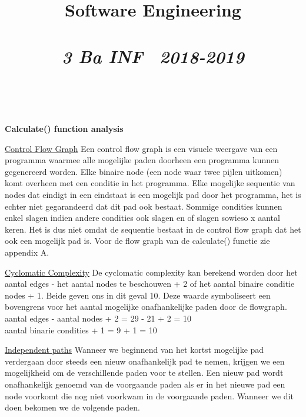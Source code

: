 \documentclass{article}
\title{\textmd{\textbf{Software Engineering}}\\\normalsize\vspace{0.1in}\Large{\assignmentname}\\\vspace{0.1in}\small{\textit{3 Ba INF \  2018-2019}}}
\author{\studentA \\ \studentB}
\begin{document}
\maketitle
\noindent
\textbf{Calculate() function analysis} \newline
\newline
\maketitle
\noindent
\underline{Control Flow Graph}\newline
\newline
Een control flow graph is een visuele weergave van een programma waarmee alle mogelijke paden doorheen een programma kunnen gegenereerd worden. Elke binaire node (een node waar twee pijlen uitkomen) komt overheen met een conditie in het programma. Elke mogelijke sequentie van nodes dat eindigt in een eindstaat is een mogelijk pad door het programma, het is echter niet gegarandeerd dat dit pad ook bestaat. Sommige condities kunnen enkel slagen indien andere condities ook slagen en of slagen sowieso x aantal keren. Het is dus niet omdat de sequentie bestaat in de control flow graph dat het ook een mogelijk pad is. Voor de flow graph van de calculate() functie zie appendix A. \\
\newline
\maketitle
\noindent
\underline{Cyclomatic Complexity}\newline
\newline
De cyclomatic complexity kan berekend worden door het aantal edges - het aantal nodes te beschouwen + 2 of het aantal binaire conditie nodes + 1. Beide geven ons in dit geval 10. Deze waarde symboliseert een bovengrens voor het aantal mogelijke onafhankelijke paden door de flowgraph. \\
aantal edges - aantal nodes + 2 = 29 - 21 + 2 = 10 \\
aantal binarie condities + 1 = 9 + 1 = 10 \\

\newpage
\maketitle
\noindent
\underline{Independent paths}\newline
\newline
Wanneer we beginnend van het kortst mogelijke pad verdergaan door steeds een nieuw onafhankelijk pad te nemen, krijgen we een mogelijkheid om de verschillende paden voor te stellen. Een nieuw pad wordt onafhankelijk genoemd van de voorgaande paden als er in het nieuwe pad een node voorkomt die nog niet voorkwam in de voorgaande paden. Wanneer we dit doen bekomen we de volgende paden. \\
\end{document}
